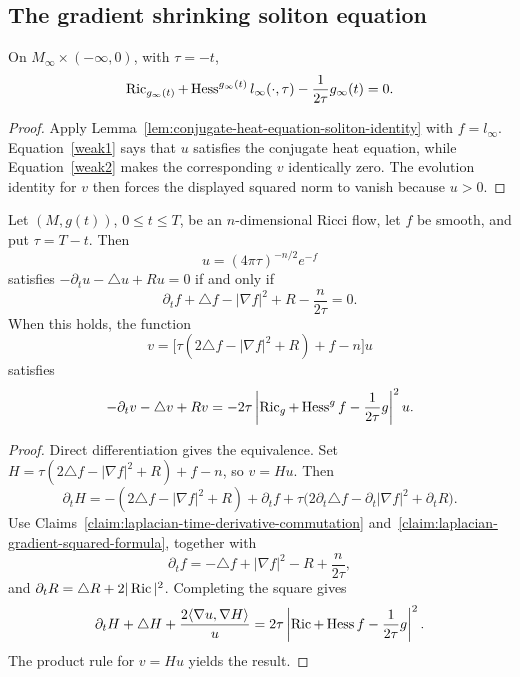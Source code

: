 \subsection{The gradient shrinking soliton equation}

\begin{proposition}\label{prop:limit-gradient-shrinking-soliton-equation}
\label{gradshrink}

On $M_\infty\times(-\infty,0)$, with $\tau=-t$,
\[
 \operatorname{Ric}_{g_\infty(t)}+\operatorname{Hess}^{g_\infty(t)}l_\infty(\cdot,\tau)
 -\frac1{2\tau}g_\infty(t)=0.
\]
\end{proposition}
\begin{proof}
\sketch Apply Lemma~\ref{lem:conjugate-heat-equation-soliton-identity}
with $f=l_\infty$. Equation~\ref{weak1} says that $u$ satisfies the
conjugate heat equation, while Equation~\ref{weak2} makes the
corresponding $v$ identically zero. The evolution identity for $v$
then forces the displayed squared norm to vanish because $u>0$.
\end{proof}

\begin{lemma}\label{lem:conjugate-heat-equation-soliton-identity}
\label{9.1}

Let $(M,g(t))$, $0\leq t\leq T$, be an $n$-dimensional Ricci flow,
let $f$ be smooth, and put $\tau=T-t$. Then
\[
 u=(4\pi\tau)^{-n/2}e^{-f}
\]
satisfies $-\partial_tu-\triangle u+Ru=0$ if and only if
\[
 \partial_tf+\triangle f-|\nabla f|^2+R-\frac n{2\tau}=0.
\]
When this holds, the function
\[
 v=\bigl[\tau(2\triangle f-|\nabla f|^2+R)+f-n\bigr]u
\]
satisfies
\[
 -\partial_tv-\triangle v+Rv
 =-2\tau\left|\operatorname{Ric}_g+\operatorname{Hess}^g f-\frac1{2\tau}g\right|^2u.
\]
\end{lemma}
\begin{proof}
\sketch Direct differentiation gives the equivalence. Set
$H=\tau(2\triangle f-|\nabla f|^2+R)+f-n$, so $v=Hu$. Then
\begin{equation}\label{dHeqn}
 \partial_tH=-(2\triangle f-|\nabla f|^2+R)+\partial_tf
 +\tau\bigl(2\partial_t\triangle f-
 \partial_t|\nabla f|^2+\partial_tR\bigr).
\end{equation}
Use Claims~\ref{claim:laplacian-time-derivative-commutation}
and~\ref{claim:laplacian-gradient-squared-formula}, together with
\begin{equation}\label{feqn}
 \partial_tf=-\triangle f+|\nabla f|^2-R+\frac n{2\tau},
\end{equation}
and $\partial_tR=\triangle R+2|\operatorname{Ric}|^2$. Completing the square gives
\[
 \partial_tH+\triangle H+
 \frac{2\langle\nabla u,\nabla H\rangle}{u}
 =2\tau\left|\operatorname{Ric}+\operatorname{Hess} f-\frac1{2\tau}g\right|^2.
\]
The product rule for $v=Hu$ yields the result.
\end{proof}

